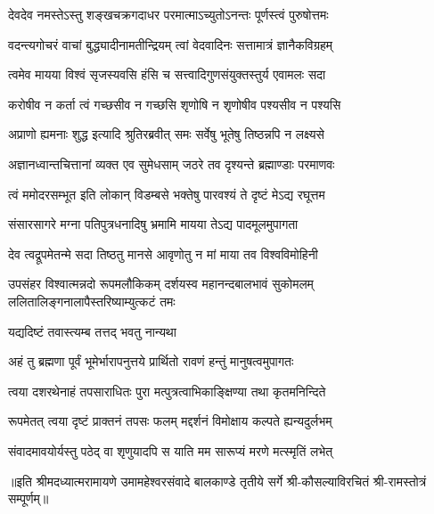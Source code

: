 

\addtocounter{shlokacount}{19}
\twolineshloka
{देवदेव नमस्तेऽस्तु शङ्खचक्रगदाधर}
{परमात्माऽच्युतोऽनन्तः पूर्णस्त्वं पुरुषोत्तमः} %

\twolineshloka
{वदन्त्यगोचरं वाचां बुद्ध्यादीनामतीन्द्रियम्}
{त्वां वेदवादिनः सत्तामात्रं ज्ञानैकविग्रहम्} %

\twolineshloka
{त्वमेव मायया विश्वं सृजस्यवसि हंसि च}
{सत्त्वादिगुणसंयुक्तस्तुर्य एवामलः सदा} %

\twolineshloka
{करोषीव न कर्ता त्वं गच्छसीव न गच्छसि}
{शृणोषि न शृणोषीव पश्यसीव न पश्यसि} %

\twolineshloka
{अप्राणो ह्यमनाः शुद्ध इत्यादि श्रुतिरब्रवीत्}
{समः सर्वेषु भूतेषु तिष्ठन्नपि न लक्ष्यसे} %

\twolineshloka
{अज्ञानध्वान्तचित्तानां व्यक्त एव सुमेधसाम्}
{जठरे तव दृश्यन्ते ब्रह्माण्डाः परमाणवः} %

\twolineshloka
{त्वं ममोदरसम्भूत इति लोकान् विडम्बसे}
{भक्तेषु पारवश्यं ते दृष्टं मेऽद्य रघूत्तम} %

\twolineshloka
{संसारसागरे मग्ना पतिपुत्रधनादिषु}
{भ्रमामि मायया तेऽद्य पादमूलमुपागता} %

\twolineshloka
{देव त्वद्रूपमेतन्मे सदा तिष्ठतु मानसे}
{आवृणोतु न मां माया तव विश्वविमोहिनी} %

\threelineshloka
{उपसंहर विश्वात्मन्नदो रूपमलौकिकम्}
{दर्शयस्व महानन्दबालभावं सुकोमलम्}
{ललितालिङ्गनालापैस्तरिष्याम्युत्कटं तमः} %


\onelineshloka
{यद्यदिष्टं तवास्त्यम्ब तत्तद् भवतु नान्यथा} %

\twolineshloka
{अहं तु ब्रह्मणा पूर्वं भूमेर्भारापनुत्तये}
{प्रार्थितो रावणं हन्तुं मानुषत्वमुपागतः} %

\twolineshloka
{त्वया दशरथेनाहं तपसाराधितः पुरा}
{मत्पुत्रत्वाभिकाङ्क्षिण्या तथा कृतमनिन्दिते} %

\twolineshloka
{रूपमेतत् त्वया दृष्टं प्राक्तनं तपसः फलम्}
{मद्दर्शनं विमोक्षाय कल्पते ह्यन्यदुर्लभम्} %

\twolineshloka
{संवादमावयोर्यस्तु पठेद् वा शृणुयादपि}
{स याति मम सारूप्यं मरणे मत्स्मृतिं लभेत्} %

{॥इति श्रीमदध्यात्मरामायणे उमामहेश्वरसंवादे बालकाण्डे
तृतीये सर्गे श्री-कौसल्याविरचितं श्री-रामस्तोत्रं सम्पूर्णम्॥}
